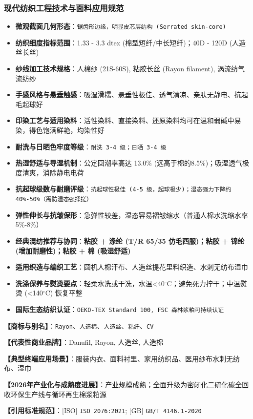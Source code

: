 \documentclass[11pt,openright,twoside,UTF8]{ctexbook}
\begin{document}
\subsubsection*{现代纺织工程技术与面料应用规范}
\begin{itemize} \setlength{\itemsep}{2pt}
    \item \textbf{微观截面几何形态}：\texttt{锯齿形边缘，明显皮芯层结构 (Serrated skin-core)}
    \item \textbf{纺织细度指标范围}：1.33 - 3.3 dtex (棉型短纤/中长短纤)；40D - 120D (人造丝长丝)
    \item \textbf{纱线加工技术规格}：人棉纱 (21S-60S), 粘胶长丝 (Rayon filament), 涡流纺气流纺纱
    \item \textbf{手感风格与悬垂触感}：吸湿滑糯、悬垂性极佳、透气清凉、亲肤无静电、抗起毛起球好
    \item \textbf{印染工艺与适用染料}：活性染料、直接染料、还原染料均可在温和弱碱中易染，得色饱满鲜艳，均染性好
    \item \textbf{耐洗与日晒色牢度等级}：\texttt{耐洗 3-4 级；日晒 3-4 级}
    \item \textbf{热湿舒适与导湿机制}：公定回潮率高达 13.0\% (远高于棉的8.5\%)；吸湿透气极度清爽，消除静电电荷
    \item \textbf{抗起球级数与耐磨评级}：\texttt{抗起球性极佳 (4-5 级，起球极少)；湿态强力下降约 40\%-50\%（需防湿态强揉搓）}
    \item \textbf{弹性伸长与抗皱保形}：急弹性较差，湿态容易褶皱缩水（普通人棉水洗缩水率 5\%-8\%）
    \item \textbf{经典混纺推荐与协同}：\textbf{粘胶 + 涤纶 (T/R 65/35 仿毛西服)；粘胶 + 锦纶 (增加耐磨性)；粘胶 + 棉 (吸湿舒适)}
    \item \textbf{适用织造与编织工艺}：圆机人棉汗布、人造丝提花里料织造、水刺无纺布湿巾
    \item \textbf{洗涤保养与熨烫要点}：轻柔水洗或干洗，水温\textless{}40$^\circ\mathrm{C}$；避免死力拧干；中温熨烫 (\textless{}140$^\circ\mathrm{C}$) 恢复平整
    \item \textbf{国际生态纺织认证}：\texttt{OEKO-TEX Standard 100, FSC 森林浆粕可持续认证}
\end{itemize}
\vspace{0.2cm}

\noindent\textbf{【商标与别名】}：\texttt{Rayon}、\texttt{人造棉}、\texttt{人造丝}、\texttt{粘纤}、\texttt{CV}\par
\noindent\textbf{【代表性商业品牌】}：Danufil, Rayon, 人造丝, 人造棉\par
\noindent\textbf{【典型终端应用场景】}：服装内衣、面料衬里、家用纺织品、医用纱布水刺无纺布、湿巾\par
\noindent\textbf{【2026年产业化与成熟度进展】}：产业规模成熟；全面升级为密闭化二硫化碳全回收环保生产线与循环再生棉浆粕源\par
\noindent\textbf{【引用标准规范】}：[ISO] \texttt{ISO 2076:2021}; [GB] \texttt{GB/T 4146.1-2020}\par
\vspace{0.5cm}
\end{document}
